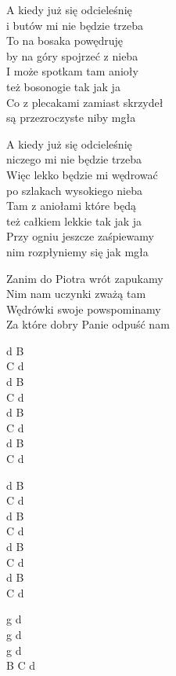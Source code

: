 \begin{text}
    A kiedy już się odcieleśnię\\
    i butów mi nie będzie trzeba\\
    To na bosaka powędruję\\
    by na góry spojrzeć z nieba\\
    I może spotkam tam anioły\\
    też bosonogie tak jak ja\\
    Co z plecakami zamiast skrzydeł\\
    są przezroczyste niby mgła

    A kiedy już się odcieleśnię\\
    niczego mi nie będzie trzeba\\
    Więc lekko będzie mi wędrować\\
    po szlakach wysokiego nieba\\
    Tam z aniołami które będą\\
    też całkiem lekkie tak jak ja\\
    Przy ogniu jeszcze zaśpiewamy\\
    nim rozpłyniemy się jak mgła

    Zanim do Piotra wrót zapukamy\\
    Nim nam uczynki zważą tam\\
    Wędrówki swoje powspominamy\\
    Za które dobry Panie odpuść nam
\end{text}
\begin{chord}
    d B\\
    C d\\
    d B\\
    C d\\
    d B\\
    C d\\
    d B\\
    C d

    d B\\
    C d\\
    d B\\
    C d\\
    d B\\
    C d\\
    d B\\
    C d

    g d\\
    g d\\
    g d\\
    B C d
\end{chord}